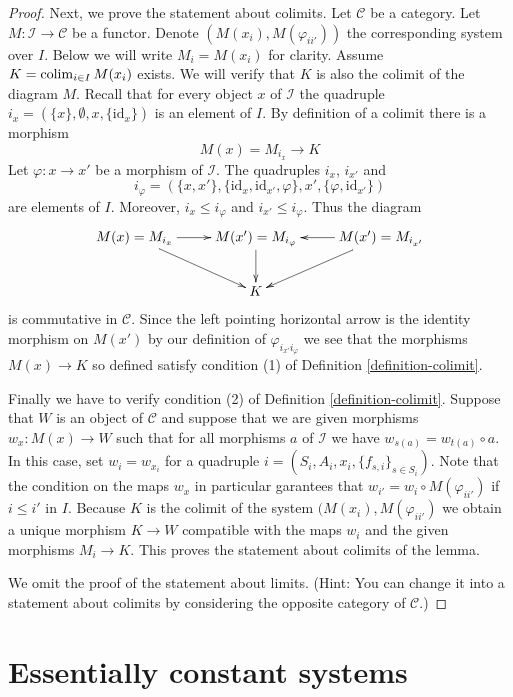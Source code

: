 \begin{proof}
\medskip\noindent
Next, we prove the statement about colimits.
Let $\mathcal{C}$ be a category.
Let $M : \mathcal{I} \to \mathcal{C}$ be a functor.
Denote $(M(x_i), M(\varphi_{ii'}))$ the corresponding system over $I$.
Below we will write $M_i = M(x_i)$ for clarity.
Assume $K = \mathop{\rm colim}\nolimits_{i \in I} M(x_i)$ exists.
We will verify that $K$ is also the colimit of the diagram $M$.
Recall that for every object $x$ of $\mathcal{I}$ the
quadruple $i_x = (\{x\}, \emptyset, x, \{\text{id}_x\})$ is an
element of $I$. By definition of a colimit there is a morphism
$$
M(x) = M_{i_x} \longrightarrow K
$$
Let $\varphi : x \to x'$ be a morphism of $\mathcal{I}$.
The quadruples $i_x$, $i_{x'}$ and
$$
i_{\varphi}
=
(\{x, x'\},
\{\text{id}_x, \text{id}_{x'}, \varphi\},
x',
\{\varphi, \text{id}_{x'}\})
$$
are elements of $I$. Moreover, $i_x \leq i_{\varphi}$ and
$i_{x'} \leq i_{\varphi}$. Thus the diagram
$$
\xymatrix{
M(x) = M_{i_x} \ar[r] \ar[dr] &
M(x') = M_{i_{\varphi}} \ar[d] &
M(x') = M_{i_{x'}} \ar[l] \ar[dl] \\
& K &
}
$$
is commutative in $\mathcal{C}$.
Since the left pointing horizontal arrow is the identity morphism
on $M(x')$ by our definition of $\varphi_{i_{x'}i_{\varphi}}$
we see that the morphisms $M(x) \to K$ so defined satisfy
condition (1) of Definition \ref{definition-colimit}.

\medskip\noindent
Finally we have to verify condition (2) of Definition \ref{definition-colimit}.
Suppose that $W$ is an object of $\mathcal{C}$ and suppose that we are
given morphisms $w_x : M(x) \to W$ such that for all morphisms
$a$ of $\mathcal{I}$ we have $w_{s(a)} = w_{t(a)} \circ a$.
In this case, set $w_i = w_{x_i}$ for a quadruple
$i = (S_i, A_i, x_i, \{f_{s, i}\}_{s \in S_i})$. Note that the
condition on the maps $w_x$ in particular garantees that
$w_{i'} = w_i \circ M(\varphi_{ii'})$ if $i \leq i'$ in $I$.
Because $K$ is the
colimit of the system $(M(x_i), M(\varphi_{ii'})$ we obtain a
unique morphism $K \to W$ compatible with the maps $w_i$
and the given morphisms $M_i \to K$. This proves the statement about
colimits of the lemma.

\medskip\noindent
We omit the proof of the statement about limits.
(Hint: You can change it into a statement about colimits
by considering the opposite category of $\mathcal{C}$.)
\end{proof}





\section{Essentially constant systems}
\label{section-essentially-constant}

